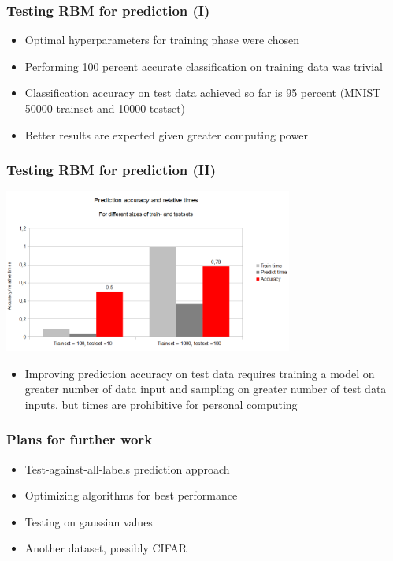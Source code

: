 \documentclass{beamer}
\begin{document}
  \begin{frame}
    \frametitle{Testing RBM for prediction (I)}
    \begin{itemize}
    \item Optimal hyperparameters for training phase were chosen
	\item Performing 100 percent accurate classification on training data was trivial 
	\item Classification accuracy on test data achieved so far is 95 percent (MNIST 50000 trainset and 10000-testset)
	\item Better results are expected given greater computing power
	\end{itemize}
  \end{frame}
  \begin{frame}
    \frametitle{Testing RBM for prediction (II)}
    \includegraphics[width=9.5cm]{images/acc.png}
    \begin{itemize}
	\item Improving prediction accuracy on test data requires training a model on greater number of data input and sampling on greater number of test data inputs, but times are prohibitive for personal computing
	\end{itemize}
  \end{frame}
  \begin{frame}
    \frametitle{Plans for further work}
    \begin{itemize}
    \item Test-against-all-labels prediction approach
    \item Optimizing algorithms for best performance
	\item Testing on gaussian values
	\item Another dataset, possibly CIFAR
	\end{itemize}
  \end{frame}
\end{document}
